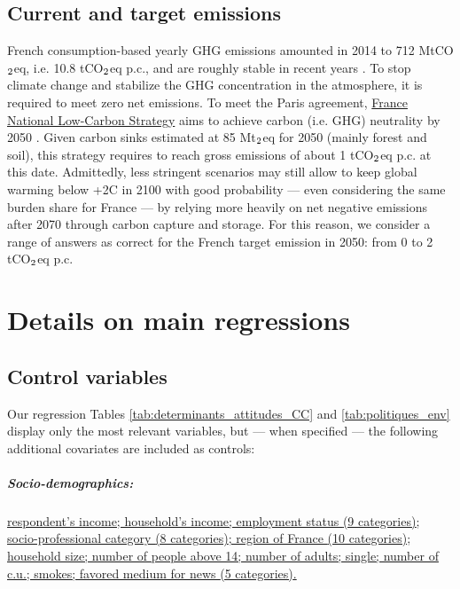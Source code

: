 \documentclass[english,5p,authoryear]{elsarticle}
\begin{document}
\begin{appendices}
\subsection{Current and target emissions\label{app:emission}}

French consumption-based yearly GHG emissions amounted in 2014 to 712 MtCO$_\textnormal{2}$eq, i.e. 10.8 tCO$_\textnormal{2}$eq p.c., and are roughly stable in recent years \citep{cgdd_chiffres_2019}. To stop climate change and stabilize the GHG concentration in the atmosphere, it is required to meet zero net emissions. To meet the Paris agreement,  \href{https://www.ecologique-solidaire.gouv.fr/strategie-nationale-bas-carbone-snbc}{France National Low-Carbon Strategy} aims to achieve carbon (i.e. GHG) neutrality by 2050 \citep{ministry_of_ecology_france_2015}. Given carbon sinks estimated at 85 Mt$_\textnormal{2}$eq for 2050 (mainly forest and soil), this strategy requires to reach gross emissions of about 1 tCO$_\textnormal{2}$eq p.c. at this date. Admittedly, less stringent scenarios may still allow to keep global warming below +2\textdegree{}C in 2100 with good probability --- even considering the same burden share for France --- by relying more heavily on net negative emissions after 2070 through carbon capture and storage. For this reason, we consider a range of answers as correct for the French target emission in 2050: from 0 to 2 tCO$_\textnormal{2}$eq p.c.

%

%
%
%
%
%
%
%
%
%
%
%
%
%
%
%
%
%
%
%
%
%
%



%
%
%
%
%
%
%
%
%
%
%
%
%
%
%
%
%
%
%
%
%
%
%
%
%
%
%
%
%
%
%
%
%
%
%
%
%
%
%
%
%
%
%
%
%
%
%
%
%
%
%
%
%
%
%
%
%

\section{Details on main regressions}
\subsection{Control variables\label{app:covariates}}

Our regression Tables \ref{tab:determinants_attitudes_CC} and \ref{tab:politiques_env} display only the most relevant variables, but --- when specified --- the following additional covariates are included as controls:

\subparagraph{Socio-demographics:} \uline{respondent's income; household's income; employment status \textnormal{(9 categories)}; socio-professional category \textnormal{(8 categories)}; region of France \textnormal{(10 categories)}; household size; number of people above 14; number of adults; single; number of c.u.; smokes; favored medium for news \textnormal{(5 categories)}.}


\end{appendices}
\end{document}
